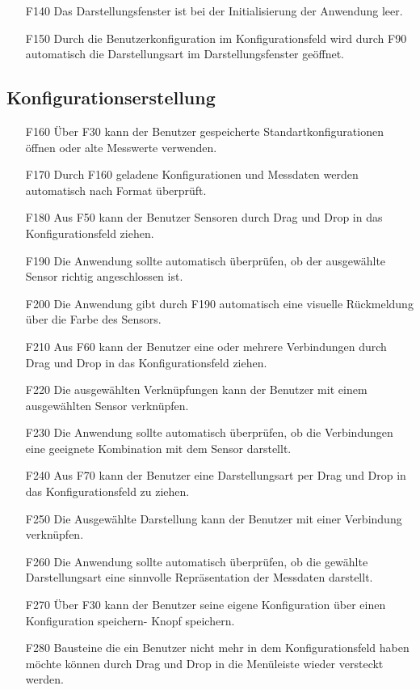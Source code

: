 \documentclass[parskip=full]{scrartcl}
\begin{document}
\begin{itemize}
\item[F140] Das Darstellungsfenster ist bei der Initialisierung der Anwendung leer.
\item[F150] Durch die Benutzerkonfiguration im Konfigurationsfeld wird durch F90 automatisch die Darstellungsart im Darstellungsfenster geöffnet.
\end{itemize}

\subsection{Konfigurationserstellung}

\begin{itemize}

\item[F160] Über F30 kann der Benutzer gespeicherte Standartkonfigurationen öffnen oder alte Messwerte verwenden.
\item[F170] Durch F160 geladene Konfigurationen und Messdaten werden automatisch nach Format überprüft.
\item[F180] Aus F50 kann der Benutzer Sensoren durch Drag und Drop in das Konfigurationsfeld ziehen.
\item[F190] Die Anwendung sollte automatisch überprüfen, ob der ausgewählte Sensor richtig angeschlossen ist.
\item[F200] Die Anwendung gibt durch F190 automatisch eine visuelle Rückmeldung über die Farbe des Sensors.
\item[F210] Aus F60 kann der Benutzer eine oder mehrere Verbindungen durch Drag und Drop in das Konfigurationsfeld ziehen.
\item[F220] Die ausgewählten Verknüpfungen kann der Benutzer mit einem ausgewählten Sensor verknüpfen.
\item[F230] Die Anwendung sollte automatisch überprüfen, ob die Verbindungen eine geeignete Kombination mit dem Sensor darstellt.
\item[F240] Aus F70 kann der Benutzer eine Darstellungsart per Drag und Drop in das Konfigurationsfeld zu ziehen.
\item[F250] Die Ausgewählte Darstellung kann der Benutzer mit einer Verbindung verknüpfen.
\item[F260] Die Anwendung sollte automatisch überprüfen, ob die gewählte Darstellungsart eine sinnvolle Repräsentation der Messdaten darstellt.
\item[F270] Über F30 kann der Benutzer seine eigene Konfiguration über einen Konfiguration speichern- Knopf speichern.
\item[F280] Bausteine die ein Benutzer nicht mehr in dem Konfigurationsfeld haben möchte können durch Drag und Drop in die Menüleiste wieder versteckt werden.

\end{itemize}
\end{document}
